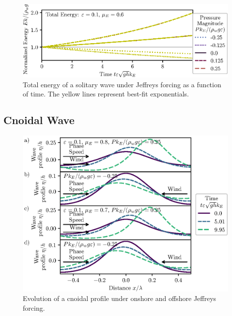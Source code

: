 \documentclass{jfm}
\let\Oldsubsection\subsection
\renewcommand{\subsection}{\FloatBarrier\Oldsubsection}
\begin{document}
\begin{figure}
  \centering
  \includegraphics{Total-Energy-Jeffreys-Solitary.eps}
  \caption{
    Total energy of a solitary wave under Jeffreys forcing as a function
    of time. The yellow lines represent best-fit exponentials.
  }
\end{figure}

\subsection{Cnoidal Wave}
\begin{figure}
  \centering
  \includegraphics{Snapshots-Positive-Negative-Cnoidal.eps}
  \caption{
    Evolution of a cnoidal profile under onshore and offshore Jeffreys
    forcing.
  }
\end{figure}
\end{document}
